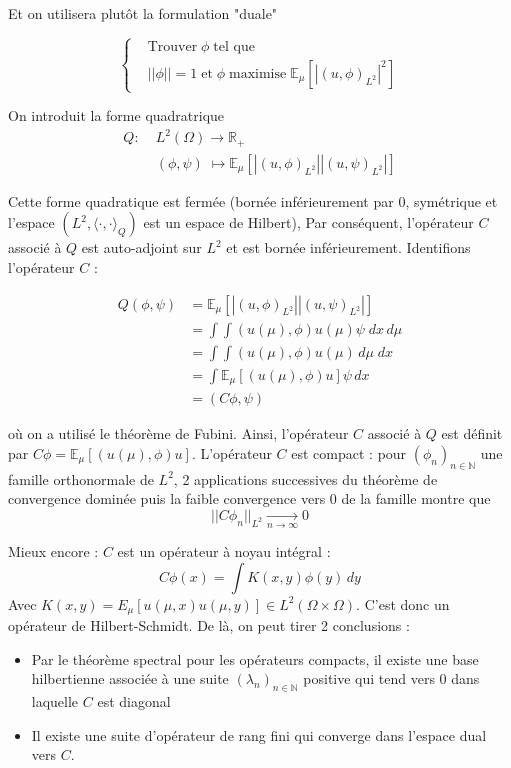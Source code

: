 \documentclass[12pt,a4paper,article]{memoir} %
\begin{document}
Et on utilisera plutôt la formulation "duale"

\begin{equation}
    \label{opt_pb}
    \begin{cases}
    &\text{Trouver}\; \phi \; \text{tel que} \\
    &||\phi|| = 1 \; \text{et} \; \phi \; \text{maximise} \; \mathbb{E}_\mu \left[|\left(u, \phi\right)_{L^2}|^2 \right]
    \end{cases}
\end{equation}

On introduit la forme quadratrique 
\begin{align*}
    Q :\; &L^2(\Omega) \longrightarrow \mathbb{R}_+ \\
        &(\phi, \psi) \; \mapsto \mathbb{E}_\mu \left[|\left(u, \phi\right)_{L^2}||\left(u, \psi\right)_{L^2}| \right]
\end{align*}

Cette forme quadratique est fermée (bornée inférieurement par 0, symétrique et l'espace $(L^2, \langle \cdot , \cdot \rangle_Q)$ est un espace de Hilbert),  
Par conséquent, l'opérateur $C$ associé à $Q$ est auto-adjoint sur $L^2$ et est bornée inférieurement. Identifions l'opérateur $C$ :

\begin{align*}
    Q(\phi , \psi) &= \mathbb{E}_\mu \left[|\left(u, \phi\right)_{L^2}||\left(u, \psi\right)_{L^2}| \right] \\
                   &= \int\int(u(\mu), \phi)u(\mu) \psi \; dx \, d\mu \\
                   &= \int \int(u(\mu), \phi)u(\mu) \, d\mu \; dx \\
                   &= \int \mathbb{E}_\mu \left[(u(\mu),\phi)u\right] \psi \, dx \\
                   &= \left(C\phi, \psi\right)
\end{align*}

où on a utilisé le théorème de Fubini. Ainsi, l'opérateur $C$ associé à $Q$ est définit par $C\phi = \mathbb{E}_\mu \left[(u(\mu),\phi)u\right]$. L'opérateur $C$ est compact : pour $(\phi_n)_{n\in\mathbb{N}}$ une famille orthonormale de 
$L^2$, 2 applications successives du théorème de convergence dominée puis la faible convergence vers 0 de la famille montre que 
\[
||C\phi_n||_{L^2} \underset{n \to \infty}{\longrightarrow} 0
\]

Mieux encore : $C$ est un opérateur à noyau intégral :
\[
C\phi(x) = \int K(x,y)\phi(y) \,dy
\]
Avec $K(x,y) = {E}_{\mu}\left[u(\mu, x)u(\mu, y)\right] \in L^2(\Omega \times \Omega)$. C'est donc un opérateur de Hilbert-Schmidt. De là, on peut tirer 2 conclusions :
\begin{itemize}
    \item[(I)] Par le théorème spectral pour les opérateurs compacts, il existe une base hilbertienne associée
                           à une suite $(\lambda_n)_{n\in\mathbb{N}}$ positive qui tend vers 0 dans laquelle $C$ est diagonal
    \item[(II)] Il existe une suite d'opérateur de rang fini qui converge dans l'espace dual vers $C$.
\end{itemize}
\end{document}
